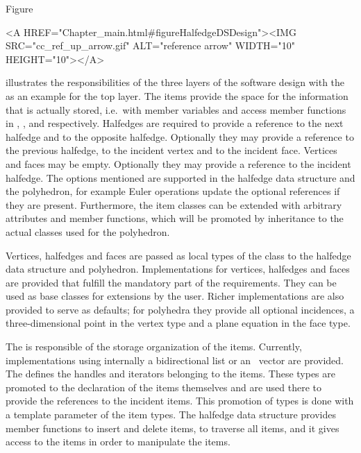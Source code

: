 Figure~\ccTexHtml{\ref{figureHalfedgeDSDesign}}{}\begin{ccHtmlOnly}
  <A HREF="Chapter_main.html#figureHalfedgeDSDesign"><IMG 
  SRC="cc_ref_up_arrow.gif" ALT="reference arrow" WIDTH="10" HEIGHT="10"></A>
\end{ccHtmlOnly}
illustrates the responsibilities of the three layers of the software
design with the  as an example for the top
layer.  The items provide the space for the information that is
actually stored, i.e.~with member variables and access member
functions in , , and 
respectively. Halfedges are required to provide a reference to the
next halfedge and to the opposite halfedge.  Optionally they may
provide a reference to the previous halfedge, to the incident vertex
and to the incident face. Vertices and faces may be empty. Optionally
they may provide a reference to the incident halfedge. The options
mentioned are supported in the halfedge data structure and the
polyhedron, for example Euler operations update the optional
references if they are present. Furthermore, the item classes can be
extended with arbitrary attributes and member functions, which will be
promoted by inheritance to the actual classes used for the polyhedron.

Vertices, halfedges and faces are passed as local types of the
 class to the halfedge data structure and polyhedron.
Implementations for vertices, halfedges and faces are provided that
fulfill the mandatory part of the requirements. They can be used as
base classes for extensions by the user. Richer implementations are
also provided to serve as defaults; for polyhedra they provide all
optional incidences, a three-dimensional point in the vertex type and
a plane equation in the face type.

The  is responsible of the storage
organization of the items. Currently, implementations using internally
a bidirectional list or an \stl\ vector are provided. The
 defines the handles and iterators
belonging to the items. These types are promoted to the declaration of
the items themselves and are used there to provide the references to
the incident items. This promotion of types is done with a template
parameter  of the item types.  The halfedge data structure
provides member functions to insert and delete items, to traverse all
items, and it gives access to the items in order to manipulate the
items.

